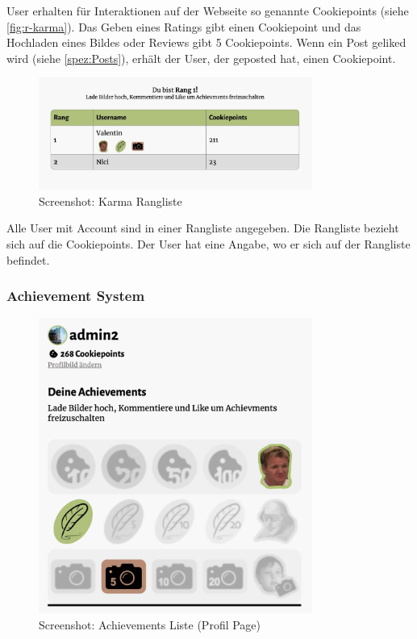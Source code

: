 User erhalten für Interaktionen auf der Webseite so genannte Cookiepoints (siehe
\ref{fig:r-karma}). Das Geben eines Ratings gibt einen Cookiepoint und das
Hochladen eines Bildes oder Reviews gibt 5 Cookiepoints. Wenn ein Post geliked
wird (siehe \ref{spez:Posts}), erhält der User, der geposted hat, einen
Cookiepoint. 

\begin{figure}[ht]
    \centering
    \includegraphics[width=0.8\textwidth]{images/Resultat_Rangliste.png}
    \caption{Screenshot: Karma Rangliste}
    \label{fig:r-rangliste}
\end{figure} 

Alle User mit Account sind in einer Rangliste angegeben. Die Rangliste bezieht
sich auf die Cookiepoints. Der User hat eine Angabe, wo er sich auf der
Rangliste befindet.

\subsubsection*{Achievement System}

\begin{figure}[ht]
    \centering
    \includegraphics[width=0.8\textwidth]{images/Resultate_Achievements.png}
    \caption{Screenshot: Achievements Liste (Profil Page)}
    \label{fig:r-Achievement}
\end{figure} 

